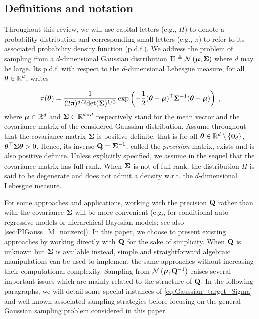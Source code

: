 \documentclass[nohypdvips,onefignum,onetabnum]{siamart171218}
\begin{document}
\subsection{Definitions and notation}
\label{subsec:motivations}

Throughout this review, we will use capital letters (e.g., $\Pi$) to denote a probability distribution and corresponding small letters (e.g., $\pi$) to refer to its associated probability density function (p.d.f.).
We address the problem of sampling from a $d$-dimensional Gaussian distribution $\Pi \triangleq \mathcal{N}\left(\boldsymbol{\mu},\mathbf{\Sigma}\right)$ where $d$ may be large.
Its p.d.f. with respect to the $d$-dimensional Lebesgue measure, for all $\boldsymbol{\theta} \in \mathbb{R}^d$, writes

\begin{equation}
  \pi(\Bs{\theta}) = \dfrac{1}{(2\uppi)^{d/2}\mathrm{det}(\B{\Sigma})^{1/2}}\exp\pr{-\dfrac{1}{2}(\Bs{\theta}-\Bs{\mu})^{\top}\B{\Sigma}^{-1}(\Bs{\theta}-\Bs{\mu})}\eqsp, \label{eq:Gaussian_target_Sigma}
\end{equation} 
where $\boldsymbol{\mu} \in \mathbb{R}^d$ and $\mathbf{\Sigma} \in \mathbb{R}^{d \times d}$ respectively stand for the mean vector and the covariance matrix of the considered Gaussian distribution.
Assume throughout that the covariance matrix $\mathbf{\Sigma}$ is positive definite, that is for all $\boldsymbol{\theta} \in \mathbb{R}^d \setminus \{\mathbf{0}_d\}$, $\boldsymbol{\theta}^{\top}\mathbf{\Sigma}\boldsymbol{\theta}>0$. 
Hence, its inverse $\mathbf{Q}=\mathbf{\Sigma}^{-1}$, called the \textit{precision} matrix, exists and is also positive definite.
Unless explicitly specified, we assume in the sequel that the covariance matrix has full rank. When $\mathbf{\Sigma}$ is not of full rank, the distribution $\Pi$ is said to be degenerate and does not admit a density w.r.t. the $d$-dimensional Lebesgue measure.

For some approaches and applications, working with the precision $\mathbf{Q}$ rather than with the covariance $\mathbf{\Sigma}$ will be more convenient (e.g., for conditional auto-regressive models or hierarchical Bayesian  models; see also \cref{sec:PIGauss_M_nonzero}).
In this paper, we choose to present existing approaches by working directly with $\mathbf{Q}$ for the sake of simplicity.
When $\mathbf{Q}$ is unknown but $\mathbf{\Sigma}$ is available instead, simple and straightforward algebraic manipulations can be used to implement the same approaches without increasing their computational complexity.
Sampling from $\mathcal{N}\left(\boldsymbol{\mu},\mathbf{Q}^{-1}\right)$ raises several important issues which are mainly related to the structure of $\mathbf{Q}$.
In the following paragraphs, we will detail some special instances of \cref{eq:Gaussian_target_Sigma} and well-known associated sampling strategies before focusing on the general Gaussian sampling problem considered in this paper.
\end{document}
